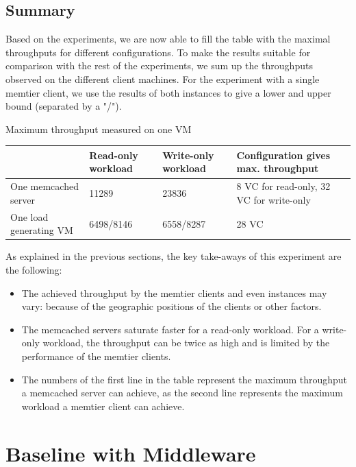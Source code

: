 \documentclass[11pt,a4paper]{article}
\begin{document}
\subsection{Summary}


Based on the experiments, we are now able to fill the table with the maximal throughputs for different configurations. To make the results suitable for comparison with the rest of the experiments, we sum up the throughputs observed on the different client machines. For the experiment with a single memtier client, we use the results of both instances to give a lower and upper bound (separated by a "/"). 

\begin{center}
	{Maximum throughput measured on one VM}
	\begin{tabular}{|l|p{2cm}|p{2cm}|p{4cm}|}
		\hline                        & Read-only workload & Write-only workload & Configuration gives max. throughput \\ 
		\hline One memcached server   &11289                    &23836                     &8 VC for read-only, 32  VC for write-only                                     \\ 
		\hline One load generating VM &6498/8146                    &6558/8287                     &28 VC                                     \\ 
		\hline 
	\end{tabular}
\end{center}
As explained in the previous sections, the key take-aways of this experiment are the following:

\begin{itemize}
\item The achieved throughput by the memtier clients and even instances may vary: because of the geographic positions of the clients or other factors. 
\item The memcached servers saturate faster for a read-only workload. For a write-only workload, the throughput can be twice as high and is limited by the performance of the memtier clients. 
\item The numbers of the first line in the table represent the maximum throughput a memcached server can achieve, as the second line represents the maximum workload a memtier client can achieve. 
\end{itemize}
\newpage

\section{Baseline with Middleware}
\end{document}

